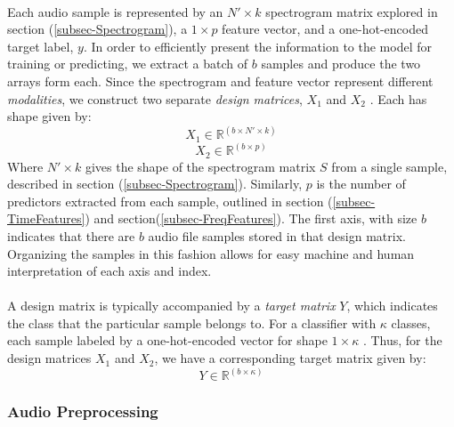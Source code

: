\documentclass[12pt,letterpaper]{article}
\begin{document}
\paragraph*{}Each audio sample is represented by an $N' \times k$ spectrogram matrix explored in section (\ref{subsec-Spectrogram}), a $1 \times p$ feature vector, and a  one-hot-encoded target label, $y$. In order to efficiently present the information to the model for training or predicting, we extract a batch of $b$ samples and produce the two arrays form each. Since the spectrogram and feature vector represent different \textit{modalities}, we construct two separate \textit{design matrices}, $X_1$ and $X_2$ \cite{Geron,Li,Ngiam}. Each has shape given by:
\begin{equation}
\label{eqn-X1Shape}
X_1 \in \mathbb{R}^{(b \times N' \times k)}
\end{equation}
\begin{equation}
\label{eqn-X2Shape}
X_2 \in \mathbb{R}^{(b \times p)}
\end{equation}
Where $N' \times k$ gives the shape of the spectrogram matrix $S$ from a single sample, described in section (\ref{subsec-Spectrogram}). Similarly, $p$ is the number of predictors extracted from each sample, outlined in section (\ref{subsec-TimeFeatures}) and section(\ref{subsec-FreqFeatures}). The first axis, with size $b$ indicates that there are $b$ audio file samples stored in that design matrix. Organizing the samples in this fashion allows for easy machine and human interpretation of each axis and index.

\paragraph*{}A design matrix is typically accompanied by a \textit{target matrix} $Y$, which indicates the class that the particular sample belongs to. For a classifier with $\kappa$ classes, each sample labeled by a one-hot-encoded vector for shape $1 \times \kappa$ \cite{Tensorflow,Loy}. Thus, for the design matrices $X_1$ and $X_2$, we have a corresponding target matrix given by:
\begin{equation}
\label{eqn-YShape}
Y \in \mathbb{R}^{(b \times \kappa)}
\end{equation}


\subsubsection{Audio Preprocessing}
\label{subsubsec-Preprocessing}
\end{document}
